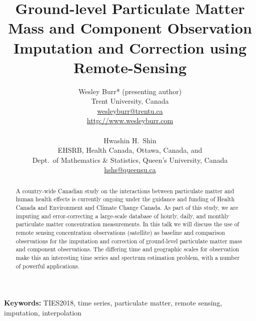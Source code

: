 \documentclass[letter, 12pt]{article} %
\date{} %
\begin{document}
\title{Ground-level Particulate Matter Mass and Component Observation Imputation and Correction using Remote-Sensing}

\author{Wesley Burr* (presenting author) \\ %
       Trent University, Canada \\
       \url{wesleyburr@trentu.ca}\\
       \url{http://www.wesleyburr.com} \\ \\%
       Hwashin H.~Shin \\ %
       EHSRB, Health Canada, Ottawa, Canada, and \\ 
       Dept.~of Mathematics \& Statistics, Queen's University, Canada \\
       \url{hshs@queensu.ca}\\%
       }%

\maketitle


\begin{abstract}
A country-wide Canadian study on the interactions between particulate matter
and human health effects is currently ongoing under the 
guidance and funding of Health Canada and Environment and Climate Change
Canada. As part of this study, we are imputing and error-correcting a
large-scale database of hourly, daily, and monthly particulate matter
concentration measurements. In this talk we will discuss the use of
remote sensing concentration observations (satellite) as baseline and
comparison observations for the imputation and correction of ground-level
particulate matter mass and component observations. The differing time
and geographic scales for observation make this an interesting time 
series and spectrum estimation problem, with a number of powerful applications.
\end{abstract}

\vspace{.5cm}

{\bf Keywords: }{TIES2018, time series, particulate matter, remote sensing, imputation, interpolation} %
\end{document}
